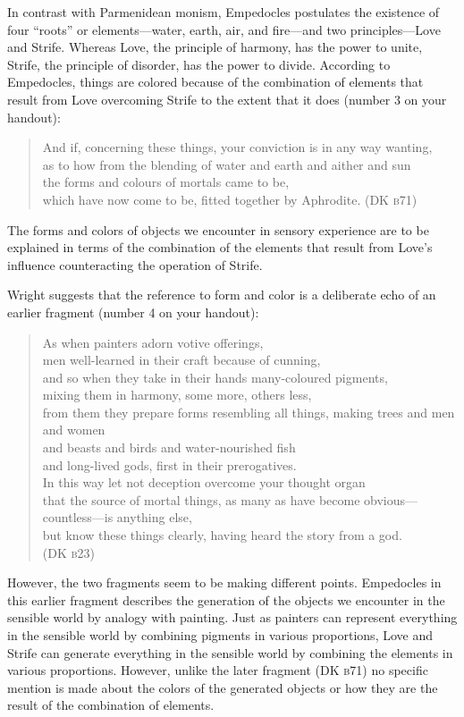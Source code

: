In contrast with Parmenidean monism, Empedocles postulates the existence of four ``roots'' or elements---water, earth, air, and fire---and two principles---\-Love and Strife. Whereas Love, the principle of harmony, has the power to unite, Strife, the principle of disorder, has the power to divide. According to Empedocles, things are colored because of the combination of elements that result from Love overcoming Strife to the extent that it does (number 3 on your handout):
\begin{verse}
    And if, concerning these things, your conviction is in any way wanting,\\
    as to how from the blending of water and earth and aither and sun\\
    the forms and colours of mortals came to be,\\
    which have now come to be, fitted together by Aphrodite.
    (DK \textsc{b}71)
\end{verse}
The forms and colors of objects we encounter in sensory experience are to be explained in terms of the combination of the elements that result from Love's influence counteracting the operation of Strife.

Wright suggests that the reference to form and color is a deliberate echo of an earlier fragment (number 4 on your handout):
\begin{verse}
    As when painters adorn votive offerings,\\
    men well-learned in their craft because of cunning,\\
    and so when they take in their hands many-coloured pigments,\\
    mixing them in harmony, some more, others less,\\
    from them they prepare forms resembling all things,
    making trees and men and women\\
    and beasts and birds and water-nourished fish\\
    and long-lived gods, first in their prerogatives.\\
    In this way let not deception overcome your thought organ\\
    that the source of mortal things, as many as have become obvious---countless---is anything else,\\
    but know these things clearly, having heard the story from a god.\\ 
    (DK \textsc{b}23)
\end{verse}
However, the two fragments seem to be making different points. Empedocles in this earlier fragment describes the generation of the objects we encounter in the sensible world by analogy with painting. Just as painters can represent everything in the sensible world by combining pigments in various proportions, Love and Strife can generate everything in the sensible world by combining the elements in various proportions. However, unlike the later fragment (DK \textsc{b}71) no specific mention is made about the colors of the generated objects or how they are the result of the combination of elements.

